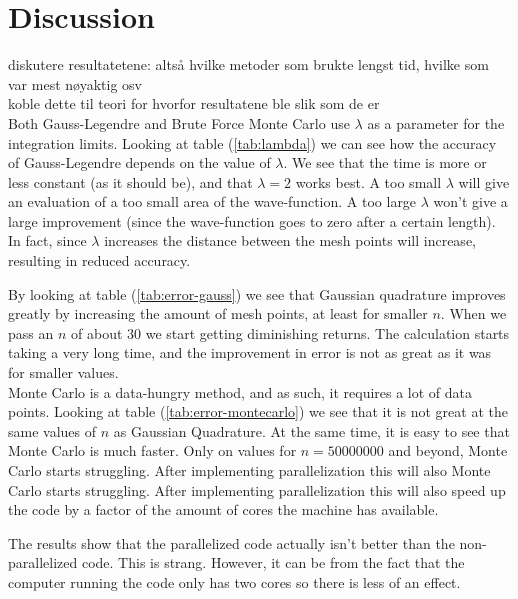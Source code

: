 \documentclass{article}
\begin{document}
\vspace{1cm}

\section{Discussion} \label{sec:Discussion}

diskutere resultatetene: altså hvilke metoder som brukte lengst tid, hvilke som var mest nøyaktig osv \\
koble dette til teori for hvorfor resultatene ble slik som de er \\

Both Gauss-Legendre and Brute Force Monte Carlo use $\lambda$ as a parameter for the integration limits. Looking at table (\ref{tab:lambda}) we can see how the accuracy of Gauss-Legendre depends on the value of $\lambda$. We see that the time is more or less constant (as it should be), and that $\lambda=2$ works best. A too small $\lambda$ will give an evaluation of a too small area of the wave-function. A too large $\lambda$ won't give a large improvement (since the wave-function goes to zero after a certain length). In fact, since $\lambda$ increases the distance between the mesh points will increase, resulting in reduced accuracy.

By looking at table (\ref{tab:error-gauss}) we see that Gaussian quadrature improves greatly by increasing the amount of mesh points, at least for smaller $n$. When we pass an $n$ of about $30$ we start getting diminishing returns. The calculation starts taking a very long time, and the improvement in error is not as great as it was for smaller values. \\

Monte Carlo is a data-hungry method, and as such, it requires a lot of data points. Looking at table (\ref{tab:error-montecarlo}) we see that it is not great at the same values of $n$ as Gaussian Quadrature. At the same time, it is easy to see that Monte Carlo is much faster. Only on values for $n=50000000$ and beyond, Monte Carlo starts struggling. After implementing parallelization this will also Monte Carlo starts struggling. After implementing parallelization this will also speed up the code by a factor of the amount of cores the machine has available.




The results show that the parallelized code actually isn't better than the non-parallelized code. This is strang. However, it can be from the fact that the computer running the code only has two cores so there is less of an effect.
\end{document}
